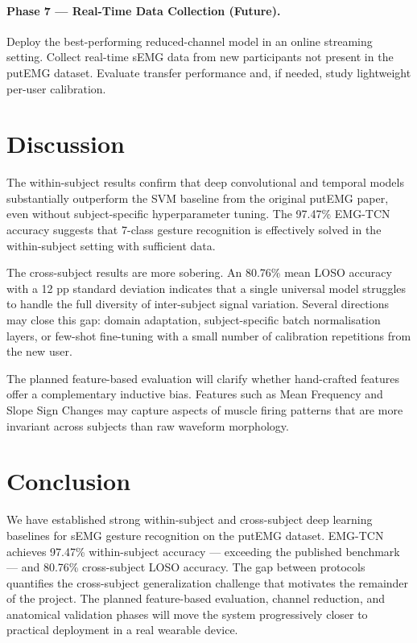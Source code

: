 \documentclass[11pt,twocolumn]{article}
\begin{document}
\paragraph{Phase 7 — Real-Time Data Collection (Future).}
Deploy the best-performing reduced-channel model in an online streaming setting.
Collect real-time sEMG data from new participants not present in the putEMG
dataset. Evaluate transfer performance and, if needed, study lightweight
per-user calibration.

\section{Discussion}

The within-subject results confirm that deep convolutional and temporal models
substantially outperform the SVM baseline from the original putEMG paper, even
without subject-specific hyperparameter tuning. The 97.47\% EMG-TCN accuracy
suggests that 7-class gesture recognition is effectively solved in the
within-subject setting with sufficient data.

The cross-subject results are more sobering. An 80.76\% mean LOSO accuracy with
a 12 pp standard deviation indicates that a single universal model struggles to
handle the full diversity of inter-subject signal variation. Several directions
may close this gap: domain adaptation, subject-specific batch normalisation
layers, or few-shot fine-tuning with a small number of calibration repetitions
from the new user.

The planned feature-based evaluation will clarify whether hand-crafted features
offer a complementary inductive bias. Features such as Mean Frequency and Slope
Sign Changes may capture aspects of muscle firing patterns that are more
invariant across subjects than raw waveform morphology.

\section{Conclusion}

We have established strong within-subject and cross-subject deep learning
baselines for sEMG gesture recognition on the putEMG dataset. EMG-TCN achieves
97.47\% within-subject accuracy — exceeding the published benchmark — and 80.76\%
cross-subject LOSO accuracy. The gap between protocols quantifies the
cross-subject generalization challenge that motivates the remainder of the
project. The planned feature-based evaluation, channel reduction, and
anatomical validation phases will move the system progressively closer to
practical deployment in a real wearable device.
\end{document}
